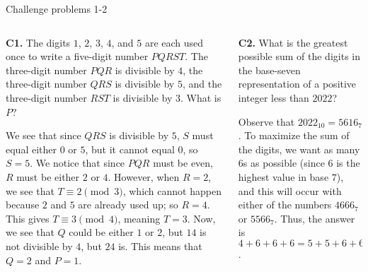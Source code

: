 \documentclass[9pt,aspectratio=169]{beamer}
\begin{document}
\begin{frame}{Challenge problems 1-2}
  \begin{columns}[T]
    \begin{column}{0.5\textwidth}
      \begin{problem}
        \textbf{C1.} The digits $1$, $2$, $3$, $4$, and $5$ are each used once to write a five-digit number $PQRST$. The three-digit number $PQR$ is divisible by $4$, the three-digit number $QRS$ is divisible by $5$, and the three-digit number $RST$ is divisible by $3$. What is $P$?
      \end{problem}\pause
      We see that since $QRS$ is divisible by $5$, $S$ must equal either $0$ or $5$, but it cannot equal $0$, so $S=5$. We notice that since $PQR$ must be even, $R$ must be either $2$ or $4$. However, when $R=2$, we see that $T \equiv 2 \pmod{3}$, which cannot happen because $2$ and $5$ are already used up; so $R=4$. This gives $T \equiv 3 \pmod{4}$, meaning $T=3$. Now, we see that $Q$ could be either $1$ or $2$, but $14$ is not divisible by $4$, but $24$ is. This means that $Q=2$ and $P=\boxed{1}$.\pause
    \end{column}
    \begin{column}{0.5\textwidth}
      \begin{problem}
        \textbf{C2.} What is the greatest possible sum of the digits in the base-seven representation of a positive integer less than $2022$?
      \end{problem}\pause
      Observe that $2022_{10} = 5616_7$. To maximize the sum of the digits, we want as many $6$s as possible (since $6$ is the highest value in base $7$), and this will occur with either of the numbers $4666_7$ or $5566_7$. Thus, the answer is $4+6+6+6 = 5+5+6+6 = \boxed{22}$.
    \end{column}
  \end{columns}
\end{frame}
\end{document}
